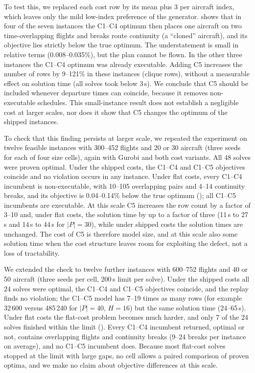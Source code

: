 To test this, we replaced each cost row by its mean plus 3 per aircraft index,
which leaves only the mild low-index preference of the generator.
 shows that in four of the seven instances the C1--C4
optimum then places one aircraft on two time-overlapping flights and breaks
route continuity (a ``cloned'' aircraft), and its objective lies strictly
below the true optimum. The understatement is small in relative terms
(0.008--0.035\%), but the plan cannot be flown. In the other three instances
the C1--C4 optimum was already executable. Adding C5 increases the number of
rows by 9--121\% in these instances (clique rows), without a measurable
effect on solution time (all solves took below 3\,s). We conclude that C5
should be included whenever departure times can coincide, because it removes
non-executable schedules. This small-instance result does not establish a
negligible cost at larger scales, nor does it show that C5 changes the optimum
of the shipped instances.

To check that this finding persists at larger scale, we repeated the
experiment on twelve feasible instances with 300--452 flights and 20 or 30
aircraft (three seeds for each of four size cells), again with Gurobi and
both cost variants. All 48 solves were proven optimal. Under the shipped costs,
the C1--C4 and C1--C5 objectives coincide and no violation occurs in any
instance. Under flat costs, every C1--C4 incumbent is non-executable, with
10--105 overlapping pairs and 4--14 continuity breaks, and its objective is
0.04--0.14\% below the true optimum (); all C1--C5
incumbents are executable. At this scale C5 increases the row count by a factor
of 3--10 and, under flat costs, the solution time by up to a factor of three
(11\,s to 27\,s and 14\,s to 44\,s for $|P|=30$), while under shipped costs the
solution times are unchanged. The cost of C5 is therefore model size, and at
this scale also some solution time when the cost structure leaves room for
exploiting the defect, not a loss of tractability.

We extended the check to twelve further instances with 600--752 flights and
40 or 50 aircraft (three seeds per cell, 200\,s limit per solve). Under the
shipped costs all 24 solves were optimal, the C1--C4 and C1--C5 objectives
coincide, and the replay finds no violation; the C1--C5 model has 7--19 times
as many rows (for example 32\,600 versus 485\,240 for $|P|=40$, $H=16$) but
the same solution time (24--65\,s). Under flat costs the flat-cost problem
becomes much harder, and only 7 of the 24 solves finished within the limit
(). Every C1--C4 incumbent returned, optimal or not,
contains overlapping flights and continuity breaks (9--24 breaks per
instance on average), and no C1--C5 incumbent does. Because most flat-cost
solves stopped at the limit with large gaps, no cell allows a paired
comparison of proven optima, and we make no claim about objective differences
at this scale.

